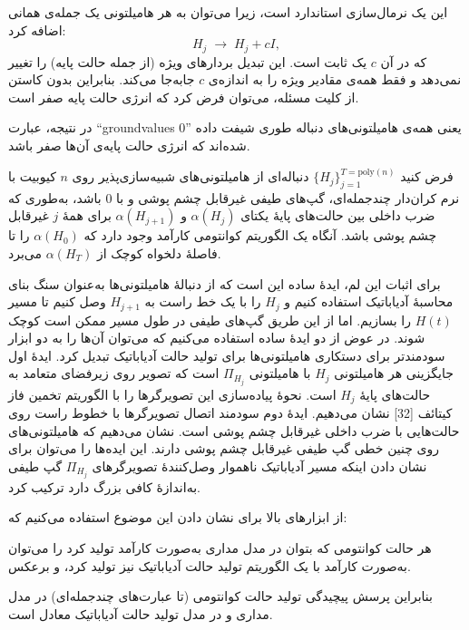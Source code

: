 این یک نرمال‌سازی استاندارد است، زیرا می‌توان به هر هامیلتونی یک جمله‌ی همانی اضافه کرد:
\[
H_j \;\longrightarrow\; H_j + c I,
\]
که در آن $c$ یک ثابت است. این تبدیل بردارهای ویژه (از جمله حالت پایه) را تغییر نمی‌دهد و فقط همه‌ی مقادیر ویژه را به اندازه‌ی $c$ جابه‌جا می‌کند. بنابراین بدون کاستن از کلیت مسئله، می‌توان فرض کرد که انرژی حالت پایه صفر است.

در نتیجه، عبارت ``groundvalues 0'' یعنی همه‌ی هامیلتونی‌های دنباله طوری شیفت داده شده‌اند که انرژی حالت پایه‌ی آن‌ها صفر باشد.
\begin{lem}
	فرض کنید $\{H_j\}_{j=1}^{T=\mathrm{poly}(n)}$ دنباله‌ای از هامیلتونی‌های شبیه‌سازی‌پذیر روی $n$ کیوبیت با نرم کران‌دار چندجمله‌ای، گپ‌های طیفی غیرقابل چشم پوشی و با 
	0 باشد، به‌طوری که ضرب داخلی بین حالت‌های پایهٔ یکتای $\alpha(H_j)$ و $\alpha(H_{j+1})$ برای همهٔ $j$ غیرقابل چشم پوشی باشد. آنگاه یک الگوریتم کوانتومی کارآمد وجود دارد که $\alpha(H_0)$ را تا فاصلهٔ دلخواه کوچک از $\alpha(H_T)$ می‌برد.
\end{lem}
برای اثبات این لم، ایدهٔ ساده این است که از دنبالهٔ هامیلتونی‌ها به‌عنوان سنگ‌ بنای محاسبهٔ آدیاباتیک استفاده کنیم و $H_j$ را با یک خط راست به $H_{j+1}$ وصل کنیم تا مسیر $H(t)$ را بسازیم. اما از این طریق گپ‌های طیفی در طول مسیر ممکن است کوچک شوند. در عوض از دو ایدهٔ ساده استفاده می‌کنیم که می‌توان آن‌ها را به دو ابزار سودمندتر برای دستکاری هامیلتونی‌ها برای تولید حالت آدیاباتیک تبدیل کرد. ایدهٔ اول جایگزینی هر هامیلتونی $H_j$ با هامیلتونی $\Pi_{H_j}$ است که تصویر روی زیرفضای متعامد به حالت‌های پایهٔ $H_j$ است. نحوهٔ پیاده‌سازی این تصویرگرها را با الگوریتم تخمین فاز کیتائف [32] نشان می‌دهیم. ایدهٔ دوم سودمند اتصال تصویرگرها با خطوط راست روی حالت‌هایی با ضرب داخلی غیرقابل چشم پوشی است. نشان می‌دهیم که هامیلتونی‌های روی چنین خطی گپ طیفی غیرقابل چشم پوشی دارند. این ایده‌ها را می‌توان برای نشان دادن اینکه مسیر آدیاباتیک ناهموار وصل‌کنندهٔ تصویرگرهای $\Pi_{H_j}$ گپ طیفی به‌اندازهٔ کافی بزرگ دارد ترکیب کرد.

از ابزارهای بالا برای نشان دادن این موضوع استفاده می‌کنیم که:

\begin{thm}
 هر حالت کوانتومی که بتوان در مدل مداری به‌صورت کارآمد تولید کرد را می‌توان به‌صورت کارآمد با یک الگوریتم تولید حالت آدیاباتیک نیز تولید کرد، و برعکس.

\end{thm}
بنابراین پرسش پیچیدگی تولید حالت کوانتومی (تا عبارت‌های چندجمله‌ای) در مدل مداری و در مدل تولید حالت آدیاباتیک معادل است.

